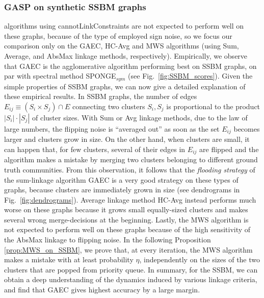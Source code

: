 \subsubsection{GASP on synthetic SSBM graphs}   
\algname{} algorithms using cannotLinkConstraints are not expected to perform well on these graphs, because of the type of employed sign noise, so we focus our comparison only on the GAEC, HC-Avg and MWS algorithms (using Sum, Average, and AbsMax linkage methods, respectively).
Empirically, we observe that GAEC is the agglomerative algorithm performing best on SSBM graphs, on par with spectral method SPONGE$_{sym}$ (see Fig.~\ref{fig:SSBM_scores}). Given the simple properties of SSBM graphs, we can now give a detailed explanation of these empirical results. 
In SSBM graphs, the number of edges $E_{ij}\equiv(S_i\times S_j)\cap E$ connecting two clusters $S_i,S_j$ is  proportional to the product $|S_i|\cdot|S_j|$ of cluster sizes. 
With Sum or Avg linkage methods, due to the law of large numbers, the flipping noise is ``averaged out'' as soon as the set $E_{ij}$ becomes larger and clusters grow in size.
On the other hand, when clusters are small, it can happen that, for few clusters, several of their edges in $E_{ij}$ are flipped and the algorithm makes a mistake by merging two clusters belonging to different ground truth communities. From this observation, it follows that the \emph{flooding strategy} of the sum-linkage algorithm GAEC is a very good strategy on these types of graphs, because clusters are immediately grown in size (see dendrograms in Fig.~\ref{fig:dendrograms}). Average linkage method HC-Avg instead performs much worse on these graphs because it grows small equally-sized clusters and makes several wrong merge-decisions at the beginning. 
Lastly, the MWS algorithm is not expected to perform well on these graphs because of the high sensitivity of the AbsMax linkage to flipping noise. In the following Proposition \ref{prop:MWS_on_SSBM}, we prove that, at every iteration, the MWS algorithm makes a mistake with at least probability $\eta$, independently on the sizes of the two clusters that are popped from priority queue. In summary, for the SSBM, we can obtain a deep understanding of the dynamics induced by various linkage criteria, and find that GAEC gives highest accuracy by a large margin.
